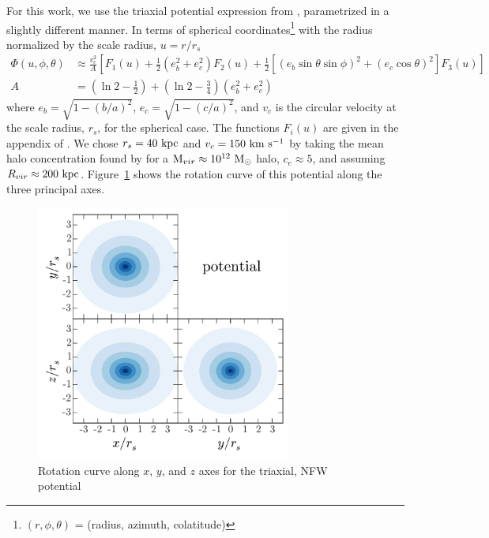 \documentclass[letterpaper,12pt,preprint]{aastex}
\newcommand{\msun}{\mathrm{M}_\odot}
\begin{document}
For this work, we use the triaxial potential expression from \citet{leesuto03}, parametrized in a slightly different manner. In terms of spherical coordinates\footnote{$(r,\phi,\theta)$ = (radius, azimuth, colatitude)} with the radius normalized by the scale radius, $u = r/r_s$
\begin{align}
	\Phi(u,\phi,\theta) &\approx \frac{v_c^2}{A}\left[F_1(u) + \frac{1}{2}(e_b^2 + e_c^2)F_2(u) + \frac{1}{2} [(e_b\sin\theta \sin\phi)^2 + (e_c\cos\theta)^2] F_3(u) \right]\\
	A &= \left(\ln2 - \frac{1}{2}\right) + \left(\ln2-\frac{3}{4}\right) (e_b^2 + e_c^2)
\end{align}
where $e_b = \sqrt{1 - (b/a)^2}$, $e_c = \sqrt{1 - (c/a)^2}$, and $v_c$ is the circular velocity at the scale radius, $r_s$, for the spherical case. The functions $F_i(u)$ are given in the appendix of \cite{leesuto03}. We chose $r_s=40~{\rm kpc}$ and $v_c = 150~{\rm km}~{\rm s}^{-1}$ by taking the mean halo concentration found by \cite{jing02} for a ${\rm M}_{vir} \approx 10^{12}~\msun$ halo, $c_e\approx5$, and assuming $R_{vir}\approx200~{\rm kpc}$. Figure~\ref{fig:potential} shows the rotation curve of this potential along the three principal axes.

\begin{figure}[!h]
\begin{center}
\includegraphics[width=0.75\textwidth]{figures/potential.pdf}
\caption{Rotation curve along $x$, $y$, and $z$ axes for the triaxial, NFW potential } \label{fig:potential}
\end{center}
\end{figure}
\end{document}
